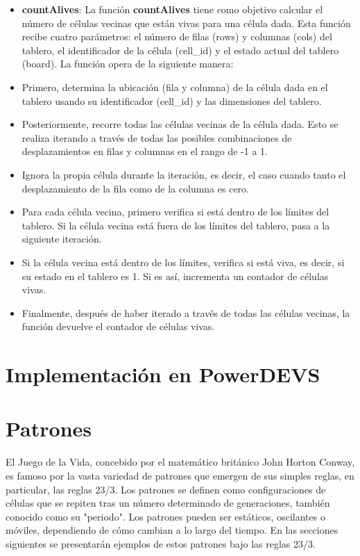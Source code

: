 \documentclass[]{article}
\begin{document}
    \begin{itemize}
      \item \textbf{countAlives}: La función \textbf{countAlives} tiene como objetivo calcular el número de células vecinas que están vivas para una célula dada. Esta función recibe cuatro parámetros: el número de filas (rows) y columnas (cols) del tablero, el identificador de la célula (cell\_id) y el estado actual del tablero (board). La función opera de la siguiente manera:

        \item Primero, determina la ubicación (fila y columna) de la célula dada en el tablero usando su identificador (cell\_id) y las dimensiones del tablero.
        \item Posteriormente, recorre todas las células vecinas de la célula dada. Esto se realiza iterando a través de todas las posibles combinaciones de desplazamientos en filas y columnas en el rango de -1 a 1. 
        \item Ignora la propia célula durante la iteración, es decir, el caso cuando tanto el desplazamiento de la fila como de la columna es cero.
        \item Para cada célula vecina, primero verifica si está dentro de los límites del tablero. Si la célula vecina está fuera de los límites del tablero, pasa a la siguiente iteración.
        \item Si la célula vecina está dentro de los límites, verifica si está viva, es decir, si su estado en el tablero es 1. Si es así, incrementa un contador de células vivas.
        \item Finalmente, después de haber iterado a través de todas las células vecinas, la función devuelve el contador de células vivas.
    \end{itemize}




\section{Implementación en PowerDEVS}
\section{Patrones}
El Juego de la Vida, concebido por el matemático británico John Horton Conway, es famoso por la vasta variedad de patrones que emergen de sus simples reglas, en particular, las reglas 23/3. Los patrones se definen como configuraciones de células que se repiten tras un número determinado de generaciones, también conocido como su "periodo". Los patrones pueden ser estáticos, oscilantes o móviles, dependiendo de cómo cambian a lo largo del tiempo. En las secciones siguientes se presentarán ejemplos de estos patrones bajo las reglas 23/3.
\end{document}
